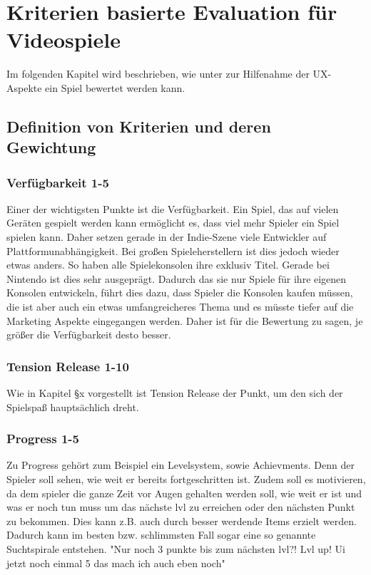 \chapter{Kriterien basierte Evaluation für Videospiele}
\label{cha:my_evaluation}

Im folgenden Kapitel wird beschrieben, wie unter zur Hilfenahme der UX-Aspekte ein Spiel bewertet werden kann. 


\section{Definition von Kriterien und deren Gewichtung} 

\subsection{Verfügbarkeit 1-5} 

Einer der wichtigsten Punkte ist die Verfügbarkeit. Ein Spiel, das auf vielen Geräten gespielt werden kann ermöglicht es, dass viel mehr Spieler ein Spiel spielen kann.
Daher setzen gerade in der Indie-Szene viele Entwickler auf Plattformunabhängigkeit. Bei großen Spieleherstellern ist dies jedoch wieder etwas anders. So haben alle Spielekonsolen ihre exklusiv Titel.
Gerade bei Nintendo ist dies sehr ausgeprägt. Dadurch das sie nur Spiele für ihre eigenen Konsolen entwickeln, führt dies dazu, dass Spieler die Konsolen kaufen müssen, die ist aber auch ein etwas umfangreicheres Thema und es müsste tiefer auf die Marketing Aspekte eingegangen werden. Daher ist für die Bewertung zu sagen, je größer die Verfügbarkeit desto besser.

\subsection{Tension Release 1-10} 

Wie in Kapitel §x vorgestellt ist Tension Release der Punkt, um den sich der Spielspaß hauptsächlich dreht. 

\subsection{Progress 1-5} 

Zu Progress gehört zum Beispiel ein Levelsystem, sowie Achievments. Denn der Spieler soll sehen, wie weit er bereits fortgeschritten ist. Zudem soll es motivieren, da dem spieler die ganze Zeit vor Augen gehalten werden soll, wie weit er ist und was er noch tun muss um das nächste lvl zu erreichen oder den nächsten Punkt zu bekommen. Dies kann z.B. auch durch besser werdende Items erzielt werden. Dadurch kann im besten bzw. schlimmsten Fall sogar eine so genannte Suchtspirale entstehen. "Nur noch 3 punkte bis zum nächsten lvl?! Lvl up! Ui jetzt noch einmal 5 das mach ich auch eben noch"

